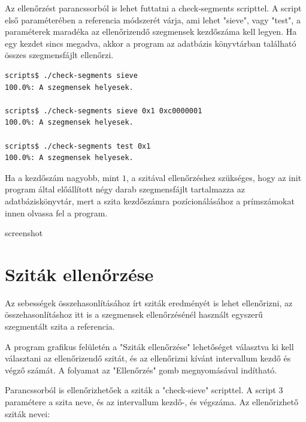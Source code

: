 \documentclass[12pt]{report}
\begin{document}
Az ellenőrzést parancssorból is lehet futtatni a check-segments scripttel.
A script első paraméterében a referencia módszerét várja,
ami lehet "sieve", vagy "test", a paraméterek maradéka az ellenőrizendő
szegmensek kezdőszáma kell legyen. Ha egy kezdet sincs megadva, akkor
a program az adatbázis könyvtárban található összes szegmensfájlt ellenőrzi.

{\tiny
\begin{lstlisting}[language=bash]
scripts$ ./check-segments sieve
100.0%: A szegmensek helyesek.             

scripts$ ./check-segments sieve 0x1 0xc0000001
100.0%: A szegmensek helyesek.             

scripts$ ./check-segments test 0x1
100.0%: A szegmensek helyesek.             

\end{lstlisting}
}

Ha a kezdőszám nagyobb, mint $1$, a szitával ellenőrzéshez szükséges,
hogy az init program által előállított négy darab szegmensfájlt tartalmazza
az adatbáziskönyvtár, mert a szita kezdőszámra pozícionálásához a prímszámokat
innen olvassa fel a program.

{\color{red}screenshot}

\section{Sziták ellenőrzése}

Az sebességek összehasonlításához írt sziták eredményét is lehet ellenőrizni,
az összehasonlításhoz itt is a szegmensek ellenőrzésénél használt
egyszerű szegmentált szita a referencia.

A program grafikus felületén a "Sziták ellenőrzése" lehetőséget
választva ki kell választani az ellenőrizendő szitát, és az ellenőrizni
kívánt intervallum kezdő és végző számát.
A folyamat az "Ellenőrzés" gomb megnyomásával indítható.

Parancssorból is ellenőrizhetőek a sziták a "check-sieve" scripttel.
A script 3 paramétere a szita neve, és az intervallum kezdő-, és végszáma.
Az ellenőrizhető sziták nevei:
\end{document}
